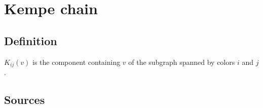 \section{Kempe chain}

\subsection*{Definition}
$K_{ij}(v)$ is the component containing $v$ of the subgraph spanned by colors $i$ and $j$.

\subsection*{Sources}
\cite{sample2020kempe,grey2006reducible}
